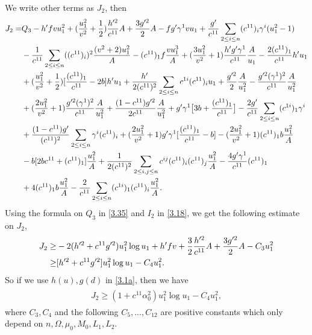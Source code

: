 \documentclass[11pt]{amsart}
\numberwithin{equation}{section}
\begin{document}
We write other terms as $J_2$, then
\begin{align}
J_2=&Q_3-h'fvu_1^2+(\frac{ u_1^2}{v^2}+\frac{1}{2})\frac{h'^2}{c^{11}}A+\frac{3g'^2}{2}A
-fg'\gamma^1vu_1+\frac{g'}{c^{11}}\sum_{2\leq i\leq n}(c^{11})_i\gamma^i(u_1^2-1)\notag\\&
-\frac{1}{c^{11}} \sum_{2\leq i\leq n}((c^{11})_{i})^2\frac{(v^2+2)u_1^2}{A}-(c^{11})_1f\frac{v u_1^3}{A}
+(\frac{ 3u_1^2}{v^2}+1)\frac{h'g'\gamma^1}{c^{11}}\frac{A}{u_1}-\frac{2(c^{11})_{1}}{c^{11}}h' u_1\notag\\&
+(\frac{ u_1^2}{v^2}+\frac{1}{2})[\frac{(c^{11})_1}{c^{11}}-2b]h'u_1
+\frac{h'}{2(c^{11})^2}\sum_{2\leq i\leq n}c^{1i}(c^{11})_i u_1+\frac{g'^2}{2}\frac{A}{u_1^2}-\frac{g'^2(\gamma^1)^2}{c^{11}}\frac{A}{u_1^2}\notag\\&
+(\frac{2u_1^2}{v^2}+1)\frac{g'^2(\gamma^1)^2}{c^{11}}\frac{A}{u_1^2}
+\frac{(1-c^{11})g'^2}{2c^{11}}\frac{A}{u_1^2}+g'\gamma^1\big[3b+\frac{(c^{11})_1}{c^{11}}\big]-\frac{2g'}{c^{11}}\sum_{2\leq i\leq n}(c^{1i})_{1}\gamma^i\notag\\&
+\frac{(1-c^{11})g'}{(c^{11})^2}\sum_{2\leq i\leq n}\gamma^i(c^{11})_i
+(\frac{ 2u_1^2}{v^2}+1)g'\gamma^1[\frac{(c^{11})_1}{c^{11}}-b]-(\frac{ 2u_1^2}{v^2}+1)(c^{11})_1b\frac{u_1^2}{A}\notag
\\&-b[2bc^{11}+(c^{11})_1]\frac{u_1^2}{A}
+\frac{1}{2(c^{11})^2}\sum_{2\leq i,j\leq n}c^{ij}(c^{11})_i(c^{11})_j \frac{u_1^2}{A}
-\frac{4g'\gamma^1}{c^{11}}(c^{11})_{1}\notag\\
&+4(c^{11})_{1} b\frac{u_1^2}{A}-\frac{2}{c^{11}}\sum_{2\leq i\leq n}(c^{1i})_{1}(c^{11})_i \frac{u_1^2}{A}.\label{3.57a}
\end{align}
Using the formula on $Q_3$ in  \eqref{3.35} and $I_2$ in  \eqref{3.18}, we get the following estimate on $J_2$,
\begin{align}
J_2\geq&-2(h'^2+c^{11}g'^2) u_1^2\log u_1+h'fv+\frac{3}{2}\frac{h'^2}{c^{11}}A+\frac{3g'^2}{2}A-C_3u_1^2\notag\\
\ge & [h'^2+c^{11}g'^2]u_1^2\log u_1-C_4u_1^2.\label{3.58}
\end{align}
So if we use $h(u), g(d)$ in \eqref{3.1a}, then we have
 \begin{align}\label{3.58a}
\begin{split}
J_2 \geq (1+c^{11}\alpha_0^2) u_1^2\log u_1-C_4u_1^2,
\end{split}
\end{align}
where  $ C_3, C_4 $  and the following $C_5, ..., C_{12}$ are  positive constants which only depend on $n, \Omega, \mu_0, M_0, L_1, L_2$.
\end{document}

